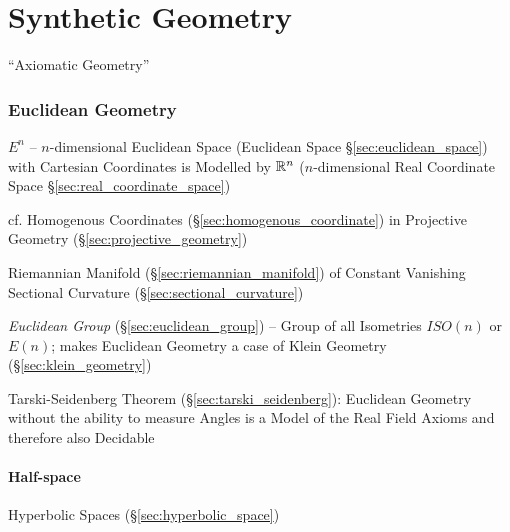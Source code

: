 \part{Synthetic Geometry}\label{part:synthetic_geometry}

``Axiomatic Geometry''



\section{Euclidean Geometry}\label{sec:euclidean_geometry}

$E^n$ -- $n$-dimensional Euclidean Space (Euclidean Space
\S\ref{sec:euclidean_space}) with Cartesian Coordinates is Modelled by
$\mathbb{R}^n$ ($n$-dimensional Real Coordinate Space
\S\ref{sec:real_coordinate_space})

\fist cf. Homogenous Coordinates (\S\ref{sec:homogenous_coordinate})
in Projective Geometry (\S\ref{sec:projective_geometry})

Riemannian Manifold (\S\ref{sec:riemannian_manifold}) of Constant Vanishing
Sectional Curvature (\S\ref{sec:sectional_curvature})

\emph{Euclidean Group} (\S\ref{sec:euclidean_group}) -- Group of all
Isometries $ISO(n)$ or $E(n)$; makes Euclidean Geometry a case of
Klein Geometry (\S\ref{sec:klein_geometry})

Tarski-Seidenberg Theorem (\S\ref{sec:tarski_seidenberg}): Euclidean Geometry
without the ability to measure Angles is a Model of the Real Field Axioms
and therefore also Decidable



\subsection{Half-space}\label{sec:half_space}

Hyperbolic Spaces (\S\ref{sec:hyperbolic_space})



